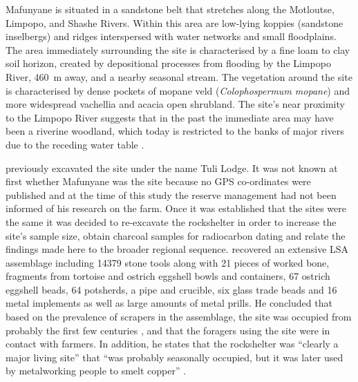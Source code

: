 	Mafunyane  is situated in a sandstone belt that stretches along the Motloutse, Limpopo, and Shashe Rivers. Within this area are low-lying koppies (sandstone inselbergs) and ridges interspersed with water networks and small floodplains. The area immediately surrounding the site is characterised by a fine loam to clay soil horizon, created by depositional processes from flooding by the Limpopo River, \SI{460}{\meter} away, and a nearby seasonal stream. 
	The vegetation around the site is characterised by dense pockets of mopane veld (\emph{Colophospermum mopane}) and more widespread vachellia and acacia open shrubland. The site’s near proximity to the Limpopo River suggests that in the past the immediate area may have been a riverine woodland, which today is restricted to the banks of major rivers due to the receding water table \parencite{Alexander_1984}.
	
	\textcite{Walker_1994} previously excavated the site under the name Tuli Lodge. It was not known at first whether Mafunyane was the \textcite{Walker_1994} site because no GPS co-ordinates were published and at the time of this study the reserve management had not been informed of his research on the farm. Once it was established that the sites were the same it was decided to re-excavate the rockshelter in order to increase the site’s sample size, obtain charcoal samples for radiocarbon dating and relate the findings made here to the broader regional sequence. \textcite{Walker_1994} recovered an extensive LSA assemblage including \num{14379} stone tools along with 21 pieces of worked bone, fragments from tortoise and ostrich eggshell bowls and containers, 67 ostrich eggshell beads, 64 potsherds, a pipe and crucible, six glass trade beads and 16 metal implements as well as large amounts of metal prills. 
	He concluded that based on the prevalence of scrapers in the assemblage, the site was occupied from probably the first few centuries \AD, and that the foragers using the site were in contact with farmers. 
In addition, he states that the rockshelter was \enquote{clearly a major living site} that 
	\enquote{was probably seasonally occupied, but it was later used by metalworking people to smelt copper} \parencite[10]{Walker_1994}. 
	
